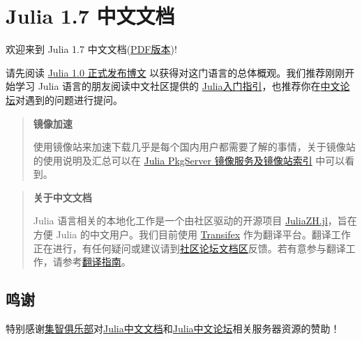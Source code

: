 
\hypertarget{12848593357497183401}{}
\part{Julia 1.7 中文文档}



欢迎来到 Julia 1.7 中文文档(\href{https://docs.juliacn.com/pdf/dev/Julia中文文档.pdf}{PDF版本})!



请先阅读 \href{https://julialang.org/blog/2018/08/one-point-zero-zh\_cn}{Julia 1.0 正式发布博文} 以获得对这门语言的总体概观。我们推荐刚刚开始学习 Julia 语言的朋友阅读中文社区提供的 \href{https://discourse.juliacn.com/t/topic/159}{Julia入门指引}，也推荐你在\href{https://discourse.juliacn.com}{中文论坛}对遇到的问题进行提问。



\begin{quote}
\textbf{镜像加速}

使用镜像站来加速下载几乎是每个国内用户都需要了解的事情，关于镜像站的使用说明及汇总可以在 \href{https://discourse.juliacn.com/t/topic/2969}{Julia PkgServer 镜像服务及镜像站索引} 中可以看到。

\end{quote}


\begin{quote}
\textbf{关于中文文档}

Julia 语言相关的本地化工作是一个由社区驱动的开源项目 \href{https://github.com/JuliaCN/JuliaZH.jl}{JuliaZH.jl}，旨在方便 Julia 的中文用户。我们目前使用 \href{https://www.transifex.com}{Transifex} 作为翻译平台。翻译工作正在进行，有任何疑问或建议请到\href{https://discourse.juliacn.com/c/community/document}{社区论坛文档区}反馈。若有意参与翻译工作，请参考\href{https://discourse.juliacn.com/t/topic/277}{翻译指南}。

\end{quote}


\hypertarget{3438032608624046543}{}


\chapter{鸣谢}





特别感谢\href{https://swarma.org}{集智俱乐部}对\href{https://docs.juliacn.com/}{Julia中文文档}和\href{https://discourse.juliacn.com/}{Julia中文论坛}相关服务器资源的赞助！



